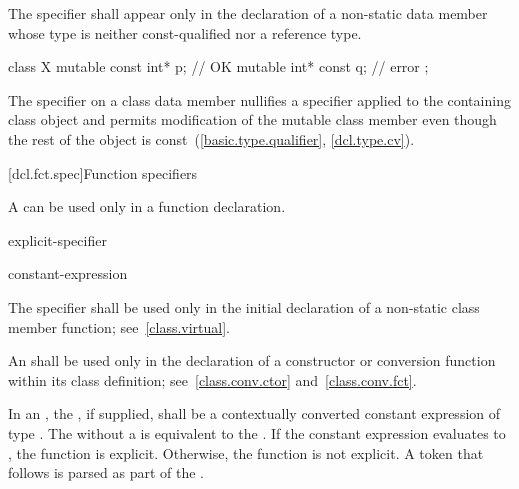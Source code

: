 \pnum
The  specifier shall appear only in the declaration of
a non-static data member
whose type is neither const-qualified nor a reference type.
\begin{example}
\begin{codeblock}
class X {
  mutable const int* p;         // OK
  mutable int* const q;         // error
};
\end{codeblock}
\end{example}

\pnum
\begin{note}
The  specifier on a class data member nullifies a
 specifier applied to the containing class object and
permits modification of the mutable class member even though the rest of
the object is const~(\ref{basic.type.qualifier}, \ref{dcl.type.cv}).
\end{note}

[dcl.fct.spec]{Function specifiers}%
%

\pnum
A
can be used only in a function declaration.

\begin{bnf}
\br
    \br
    explicit-specifier
\end{bnf}

\begin{bnf}
\br
     \terminal{(} constant-expression \terminal{)}\br
\end{bnf}

\pnum
{}%
The  specifier shall be used only in the initial
declaration of a non-static class member function;
see~\ref{class.virtual}.

\pnum
{}%
An  shall be used only in the declaration of
a constructor or conversion function within its class definition;
see~\ref{class.conv.ctor} and~\ref{class.conv.fct}.

\pnum
In an ,
the , if supplied, shall be a
contextually converted constant expression of type .
The  
without a  is equivalent to
the  .
If the constant expression evaluates to ,
the function is explicit. Otherwise, the function is not explicit.
A \tcode{(} token that follows  is parsed as
part of the .

